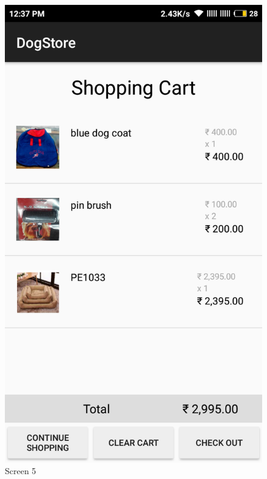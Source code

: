 \begin{figure}[ht]
\centering
\includegraphics[scale=0.30]{images/g2.png}
\caption{Screen 5}


\end{figure}

\newpage

